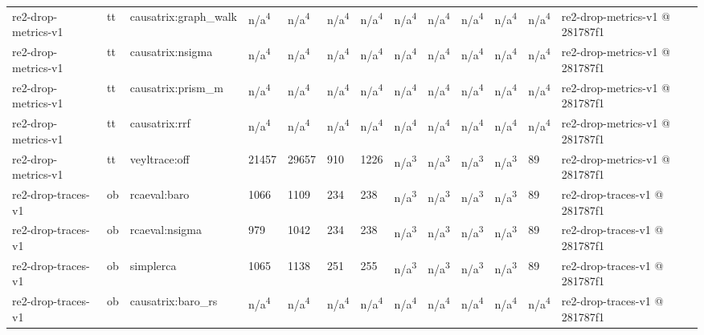 \begin{table}[t]
\begin{tabular}{lllllllllllll}
re2-drop-metrics-v1 & tt & causatrix:graph\_walk & n/a\textsuperscript{4} & n/a\textsuperscript{4} & n/a\textsuperscript{4} & n/a\textsuperscript{4} & n/a\textsuperscript{4} & n/a\textsuperscript{4} & n/a\textsuperscript{4} & n/a\textsuperscript{4} & n/a\textsuperscript{4} & re2-drop-metrics-v1 @ 281787f1 \\
re2-drop-metrics-v1 & tt & causatrix:nsigma & n/a\textsuperscript{4} & n/a\textsuperscript{4} & n/a\textsuperscript{4} & n/a\textsuperscript{4} & n/a\textsuperscript{4} & n/a\textsuperscript{4} & n/a\textsuperscript{4} & n/a\textsuperscript{4} & n/a\textsuperscript{4} & re2-drop-metrics-v1 @ 281787f1 \\
re2-drop-metrics-v1 & tt & causatrix:prism\_m & n/a\textsuperscript{4} & n/a\textsuperscript{4} & n/a\textsuperscript{4} & n/a\textsuperscript{4} & n/a\textsuperscript{4} & n/a\textsuperscript{4} & n/a\textsuperscript{4} & n/a\textsuperscript{4} & n/a\textsuperscript{4} & re2-drop-metrics-v1 @ 281787f1 \\
re2-drop-metrics-v1 & tt & causatrix:rrf & n/a\textsuperscript{4} & n/a\textsuperscript{4} & n/a\textsuperscript{4} & n/a\textsuperscript{4} & n/a\textsuperscript{4} & n/a\textsuperscript{4} & n/a\textsuperscript{4} & n/a\textsuperscript{4} & n/a\textsuperscript{4} & re2-drop-metrics-v1 @ 281787f1 \\
re2-drop-metrics-v1 & tt & veyltrace:off & 21457 & 29657 & 910 & 1226 & n/a\textsuperscript{3} & n/a\textsuperscript{3} & n/a\textsuperscript{3} & n/a\textsuperscript{3} & 89 & re2-drop-metrics-v1 @ 281787f1 \\
re2-drop-traces-v1 & ob & rcaeval:baro & 1066 & 1109 & 234 & 238 & n/a\textsuperscript{3} & n/a\textsuperscript{3} & n/a\textsuperscript{3} & n/a\textsuperscript{3} & 89 & re2-drop-traces-v1 @ 281787f1 \\
re2-drop-traces-v1 & ob & rcaeval:nsigma & 979 & 1042 & 234 & 238 & n/a\textsuperscript{3} & n/a\textsuperscript{3} & n/a\textsuperscript{3} & n/a\textsuperscript{3} & 89 & re2-drop-traces-v1 @ 281787f1 \\
re2-drop-traces-v1 & ob & simplerca & 1065 & 1138 & 251 & 255 & n/a\textsuperscript{3} & n/a\textsuperscript{3} & n/a\textsuperscript{3} & n/a\textsuperscript{3} & 89 & re2-drop-traces-v1 @ 281787f1 \\
re2-drop-traces-v1 & ob & causatrix:baro\_rs & n/a\textsuperscript{4} & n/a\textsuperscript{4} & n/a\textsuperscript{4} & n/a\textsuperscript{4} & n/a\textsuperscript{4} & n/a\textsuperscript{4} & n/a\textsuperscript{4} & n/a\textsuperscript{4} & n/a\textsuperscript{4} & re2-drop-traces-v1 @ 281787f1 \\

\end{tabular}
\end{table}
